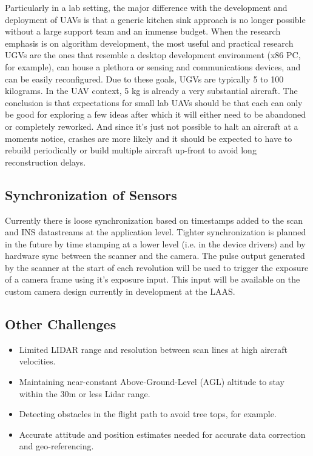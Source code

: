 \documentclass[a4paper,11pt]{report}
\begin{document}
Particularly in a lab setting, the major difference with the development and deployment of UAVs is that a generic kitchen sink approach is no longer possible without a large support team and an immense budget. When the research emphasis is on algorithm development, the most useful and practical research UGVs are the ones that resemble a desktop development environment (x86 PC, for example), can house a plethora or sensing and communications devices, and can be easily reconfigured. Due to these goals, UGVs are typically 5 to 100 kilograms. In the UAV context, 5 kg is already a very substantial aircraft. The conclusion is that expectations for small lab UAVs should be that each can only be good for exploring a few ideas after which it will either need to be abandoned or completely reworked. And since it's just not possible to halt an aircraft at a moments notice, crashes are more likely and it should be expected to have to rebuild periodically or build multiple aircraft up-front to avoid long reconstruction delays.

\subsection{Synchronization of Sensors}
 
Currently there is loose synchronization based on timestamps added to the scan and INS datastreams at the application level. Tighter synchronization is planned in the future by time stamping at a lower level (i.e. in the device drivers) and by hardware sync between the scanner and the camera. The pulse output generated by the scanner at the start of each revolution will be used to trigger the exposure of a camera frame using it's exposure input. This input will be available on the custom camera design currently in development at the LAAS.

\subsection{Other Challenges}

\begin{itemize}
 \item Limited LIDAR range and resolution between scan lines at high aircraft velocities.
 \item Maintaining near-constant Above-Ground-Level (AGL) altitude to stay within the 30m or less Lidar range.
 \item Detecting obstacles in the flight path to avoid tree tops, for example.
 \item Accurate attitude and position estimates needed for accurate data correction and geo-referencing.
\end{itemize}
\end{document}
